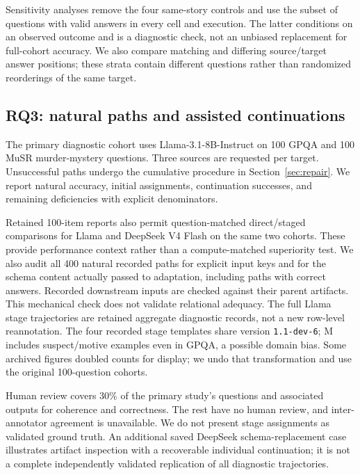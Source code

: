 Sensitivity analyses remove the four same-story controls and use the subset of questions with valid answers in every cell and execution. The latter conditions on an observed outcome and is a diagnostic check, not an unbiased replacement for full-cohort accuracy. We also compare matching and differing source/target answer positions; these strata contain different questions rather than randomized reorderings of the same target.

\subsection{RQ3: natural paths and assisted continuations}
\label{sec:phase3method}
The primary diagnostic cohort uses Llama-3.1-8B-Instruct on 100 GPQA and 100 MuSR murder-mystery questions. Three sources are requested per target. Unsuccessful paths undergo the cumulative procedure in Section~\ref{sec:repair}. We report natural accuracy, initial assignments, continuation successes, and remaining deficiencies with explicit denominators.

Retained 100-item reports also permit question-matched direct/staged comparisons for Llama and DeepSeek V4 Flash on the same two cohorts. These provide performance context rather than a compute-matched superiority test. We also audit all 400 natural recorded paths for explicit input keys and for the schema content actually passed to adaptation, including paths with correct answers. Recorded downstream inputs are checked against their parent artifacts. This mechanical check does not validate relational adequacy. The full Llama stage trajectories are retained aggregate diagnostic records, not a new row-level reannotation. The four recorded stage templates share version \texttt{1.1-dev-6}; M includes suspect/motive examples even in GPQA, a possible domain bias. Some archived figures doubled counts for display; we undo that transformation and use the original 100-question cohorts.

Human review covers 30\% of the primary study's questions and associated outputs for coherence and correctness. The rest have no human review, and inter-annotator agreement is unavailable. We do not present stage assignments as validated ground truth. An additional saved DeepSeek schema-replacement case illustrates artifact inspection with a recoverable individual continuation; it is not a complete independently validated replication of all diagnostic trajectories.
